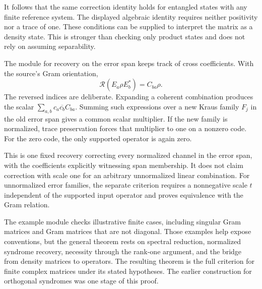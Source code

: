 It follows that the same correction identity holds for entangled states with any finite reference system. The displayed algebraic identity requires neither positivity nor a trace of one. These conditions can be supplied to interpret the matrix as a density state. This is stronger than checking only product states and does not rely on assuming separability.

The module for recovery on the error span keeps track of cross coefficients. With the source's Gram orientation,
\[
\mathcal R(E_a\rho E_b^*)=C_{ba}\rho.
\]
The reversed indices are deliberate. Expanding a coherent combination produces the scalar $\sum_{a,b}c_a\overline{c_b}C_{ba}$. Summing such expressions over a new Kraus family $F_j$ in the old error span gives a common scalar multiplier. If the new family is normalized, trace preservation forces that multiplier to one on a nonzero code. For the zero code, the only supported operator is again zero.


This is one fixed recovery correcting every normalized channel in the error span, with the coefficients explicitly witnessing span membership. It does not claim correction with scale one for an arbitrary unnormalized linear combination. For unnormalized error families, the separate criterion requires a nonnegative scale $t$ independent of the supported input operator and proves equivalence with the Gram relation.


The example module checks illustrative finite cases, including singular Gram matrices and Gram matrices that are not diagonal. Those examples help expose conventions, but the general theorem rests on spectral reduction, normalized syndrome recovery, necessity through the rank-one argument, and the bridge from density matrices to operators. The resulting theorem is the full criterion for finite complex matrices under its stated hypotheses. The earlier construction for orthogonal syndromes was one stage of this proof.
